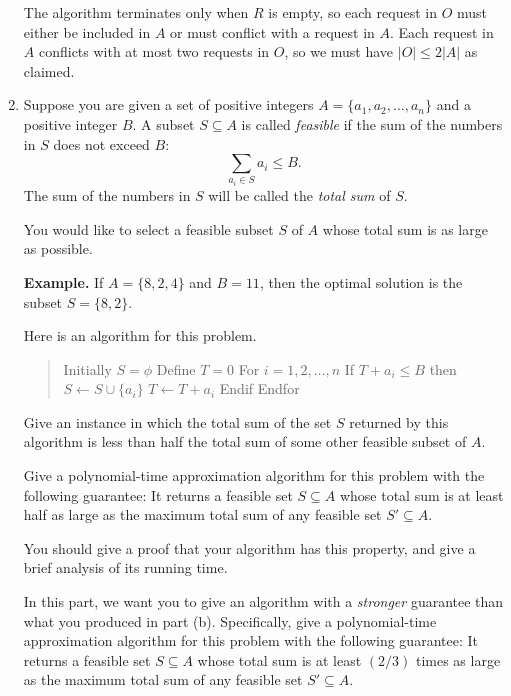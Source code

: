 \documentclass[12pt]{article}
\begin{document}
\begin{enumerate}
{The algorithm terminates only when $R$ is empty, so each request
in $O$ must either be included in $A$ or must conflict with a request
in $A$. Each request in $A$ conflicts with at most two requests in $O$,
so we must have $|O| \le 2|A|$ as claimed.
}


\item 

Suppose you are given a set of positive integers
$A = \{a_1, a_2, \ldots, a_n\}$ and a positive integer $B$.
A subset $S \subseteq A$ is called {\em feasible}
if the sum of the numbers in $S$ does not exceed $B$:
$$\sum_{a_i \in S} a_i \leq B.$$
The sum of the numbers in $S$ will be called
the {\em total sum} of $S$.

You would like to select a feasible subset $S$ of $A$
whose total sum is as large as possible.

{\bf Example.}
If $A = \{8, 2, 4\}$ and $B = 11$, then the optimal
solution is the subset $S = \{8, 2\}$.

\medskip
{} 
Here is an algorithm for this problem.
\begin{quote}
\begin{code}
Initially $S = \phi$
Define $T = 0$
For $i = 1, 2, \ldots, n$
  If $T + a_i \leq B$ then
    $S \gets S \cup \{a_i\}$
    $T \gets T + a_i$
  Endif
Endfor
\end{code}
\end{quote}

Give an instance in which the total sum of the
set $S$ returned by this algorithm is less than
half the total sum of some other feasible subset of $A$.

Give a polynomial-time approximation algorithm for this problem with
the following guarantee:
It returns a feasible set $S \subseteq A$ whose total sum is
at least half as large as the maximum total sum of
any feasible set $S' \subseteq A$.

You should give a proof that your algorithm has this property,
and give a brief analysis of its running time.

In this part, we want you to give an
algorithm with a {\em stronger} guarantee than what
you produced in part (b).
Specifically, give a polynomial-time approximation algorithm
for this problem with the following guarantee:
It returns a feasible set $S \subseteq A$ whose total sum is
at least $(2/3)$ times as large as the maximum total sum of
any feasible set $S' \subseteq A$.


\end{enumerate}
\end{document}
